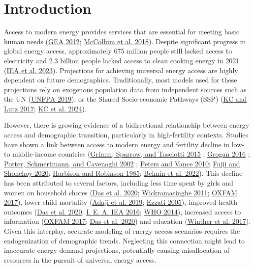 \documentclass[
]{article}
\begin{document}
\newpage

\hypertarget{intro}{%
\section{Introduction}\label{intro}}

Access to modern energy provides services that are essential for meeting basic human needs (\protect\hyperlink{ref-gea_global_2012}{GEA 2012}; \protect\hyperlink{ref-mccollum_connecting_2018}{McCollum et al. 2018}). Despite significant progress in global energy access, approximately 675 million people still lacked access to electricity and 2.3 billion people lacked access to clean cooking energy in 2021 (\protect\hyperlink{ref-iea_tracking_2023}{IEA et al. 2023}). Projections for achieving universal energy access are highly dependent on future demographics. Traditionally, most models used for these projections rely on exogenous population data from independent sources such as the UN (\protect\hyperlink{ref-unfpa_world_2019}{UNFPA 2019}), or the Shared Socio-economic Pathways (SSP) (\protect\hyperlink{ref-kc_human_2017}{KC and Lutz 2017}; \protect\hyperlink{ref-kc_updating_2024}{KC et al. 2024}).

However, there is growing evidence of a bidirectional relationship between energy access and demographic transition, particularly in high-fertility contexts. Studies have shown a link between access to modern energy and fertility decline in low- to middle-income countries (\protect\hyperlink{ref-grimm_does_2015}{Grimm, Sparrow, and Tasciotti 2015} ; \protect\hyperlink{ref-grogan_household_2016}{Grogan 2016} ; \protect\hyperlink{ref-potter_fertility_2002}{Potter, Schmertmann, and Cavenaghi 2002} ; \protect\hyperlink{ref-peters_rural_2010}{Peters and Vance 2010}; \protect\hyperlink{ref-fujii_fertility_2020}{Fujii and Shonchoy 2020}; \protect\hyperlink{ref-harbison_rural_1985}{Harbison and Robinson 1985}; \protect\hyperlink{ref-belmin_fertility_2022}{Belmin et al. 2022}). This decline has been attributed to several factors, including less time spent by girls and women on household chores (\protect\hyperlink{ref-das_virtuous_2020}{Das et al. 2020}; \protect\hyperlink{ref-wickramasinghe_energy_2011}{Wickramasinghe 2011}; \protect\hyperlink{ref-oxfam_energy_2017}{OXFAM 2017}), lower child mortality (\protect\hyperlink{ref-adaji_understanding_2019}{Adaji et al. 2019}; \protect\hyperlink{ref-ezzati_indoor_2005}{Ezzati 2005}), improved health outcomes (\protect\hyperlink{ref-das_virtuous_2020}{Das et al. 2020}; \protect\hyperlink{ref-iea_weo-2016_2016}{I. E. A. IEA 2016}; \protect\hyperlink{ref-who_who_2014}{WHO 2014}), increased access to information (\protect\hyperlink{ref-oxfam_energy_2017}{OXFAM 2017}; \protect\hyperlink{ref-das_virtuous_2020}{Das et al. 2020}) and education (\protect\hyperlink{ref-winther_womens_2017}{Winther et al. 2017}). Given this interplay, accurate modeling of energy access scenarios requires the endogenization of demographic trends. Neglecting this connection might lead to inaccurate energy demand projections, potentially causing misallocation of resources in the pursuit of universal energy access.
\end{document}
